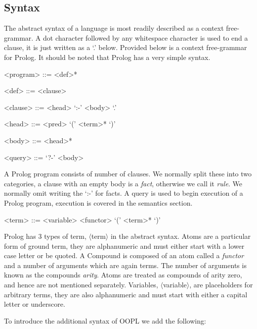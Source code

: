 \documentclass[12pt,a4paper,twoside,openright]{report}
\begin{document}
\subsection {Syntax}

The abstract syntax of a language is most readily described as a context free-grammar. A dot character followed by any whitespace character is used to end a clause, it is just written as a `.' below. Provided below is a context free-grammar for Prolog. It should be noted that Prolog has a very simple syntax.

\begin{grammar}

<program> ::= <def>*
		
<def> ::= <clause>
		
<clause> ::= <head> `:-' <body> `.'
		
<head> 	::= <pred> `(' <term>* `)'
		
<body> ::= <head>*

<query> ::= `?-' <body>

\end{grammar}		

A Prolog program consists of number of clauses. We normally split these into two categories, a clause with an empty body is a \emph{fact}, otherwise we call it \emph{rule}. We normally omit writing the `:-' for facts. A query is used to begin execution of a Prolog program, execution is covered in the semantics section.

\begin{grammar}	
				
<term> ::= <variable>
\alt <functor> `(' <term>* `)'

\end{grammar}

Prolog has 3 types of term, $\langle$term$\rangle$ in the abstract syntax. Atoms are a particular form of ground term, they are alphanumeric and must either start with a lower case letter or be quoted. A Compound is composed of an atom called a \emph{functor} and a number of arguments which are again terms. The number of arguments is known as the compounds \emph{arity}. Atoms are treated as compounds of arity zero, and hence are not mentioned separately. Variables, $\langle$variable$\rangle$, are placeholders for arbitrary terms, they are also alphanumeric and must start with either a capital letter or underscore.

\bigskip

To introduce the additional syntax of OOPL we add the following:
\end{document}
